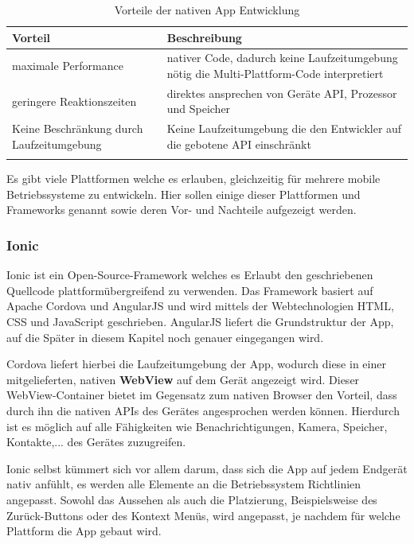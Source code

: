 \begin{table} [H]
	\begin{center}
		\begin{tabular}{p{4cm} p{10cm}}
			\rowcolor{black!20}  \textbf{Vorteil} & \textbf{Beschreibung} \\
			\hline \toprule
			maximale Performance & nativer Code, dadurch keine Laufzeitumgebung nötig die Multi-Plattform-Code interpretiert \\ \hline \addlinespace
			geringere Reaktionszeiten & direktes ansprechen von Geräte API, Prozessor und Speicher \\ \hline \addlinespace
			Keine Beschränkung durch Laufzeitumgebung & Keine Laufzeitumgebung die den Entwickler auf die gebotene API einschränkt \\ \hline \addlinespace
		\end{tabular}
	\end{center}
	\label{VorteileNativ}
	\caption[Vorteile der nativen App Entwicklung]{Vorteile der nativen App Entwicklung}
\end{table}

Es gibt viele Plattformen welche es erlauben, gleichzeitig für mehrere mobile Betriebssysteme zu entwickeln. Hier sollen einige dieser Plattformen und Frameworks genannt sowie deren Vor- und Nachteile aufgezeigt werden.

\subsubsection{Ionic}
Ionic ist ein Open-Source-Framework welches es Erlaubt den geschriebenen Quellcode plattformübergreifend zu verwenden. Das Framework basiert auf Apache Cordova und AngularJS und wird mittels der Webtechnologien HTML, CSS und JavaScript geschrieben. AngularJS liefert die Grundstruktur der App, auf die Später in diesem Kapitel noch genauer eingegangen wird.

Cordova liefert hierbei die Laufzeitumgebung der App, wodurch diese in einer mitgelieferten, nativen \textbf{WebView} auf dem Gerät angezeigt wird. Dieser WebView-Container bietet im Gegensatz zum nativen Browser den Vorteil, dass durch ihn die nativen APIs des Gerätes angesprochen werden können. Hierdurch ist es möglich auf alle Fähigkeiten wie Benachrichtigungen, Kamera, Speicher, Kontakte,... des Gerätes zuzugreifen.

Ionic selbst kümmert sich vor allem darum, dass sich die App auf jedem Endgerät nativ anfühlt, es werden alle Elemente an die Betriebssystem Richtlinien angepasst. Sowohl das Aussehen als auch die Platzierung, Beispielsweise des Zurück-Buttons oder des Kontext Menüs, wird angepasst, je nachdem für welche Plattform die App gebaut wird. 

